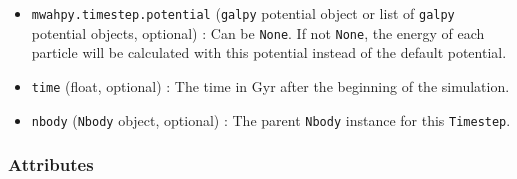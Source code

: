 \documentclass{article}
\begin{document}
\begin{itemize}
\item \verb!mwahpy.timestep.potential! (\verb!galpy! potential object or list of \verb!galpy! potential objects, optional) : Can be \verb!None!. If not \verb!None!, the energy of each particle will be calculated with this potential instead of the default \mwahpy potential. 

\item \verb!time! (float, optional) : The time in Gyr after the beginning of the simulation. 

\item \verb!nbody! (\verb!Nbody! object, optional) : The parent \verb!Nbody! instance for this \verb!Timestep!.

\end{itemize}

\subsubsection{Attributes}
\end{document}

